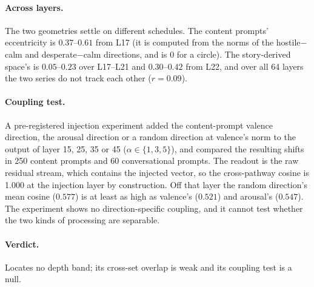 \paragraph{Across layers.} The two geometries settle on different schedules. The
content prompts' eccentricity is $0.37$--$0.61$ from L17 (it is computed from the norms
of the hostile$-$calm and desperate$-$calm directions, and is 0 for a circle). The
story-derived space's is $0.05$--$0.23$ over L17--L21 and $0.30$--$0.42$ from L22, and
over all 64 layers the two series do not track each other ($r = 0.09$).

\paragraph{Coupling test.} A pre-registered injection experiment added the
content-prompt valence direction, the arousal direction or a random direction at
valence's norm to the output of layer 15, 25, 35 or 45 ($\alpha \in \{1, 3, 5\}$), and
compared the resulting shifts in 250 content prompts and 60 conversational prompts.
The readout is the raw residual stream, which contains the injected vector, so the
cross-pathway cosine is 1.000 at the injection layer by construction. Off that layer
the random direction's mean cosine ($0.577$) is at least as high as valence's ($0.521$)
and arousal's ($0.547$). The experiment shows no direction-specific coupling, and it
cannot test whether the two kinds of processing are separable.

\paragraph{Verdict.} Locates no depth band; its cross-set overlap is weak and its
coupling test is a null.
